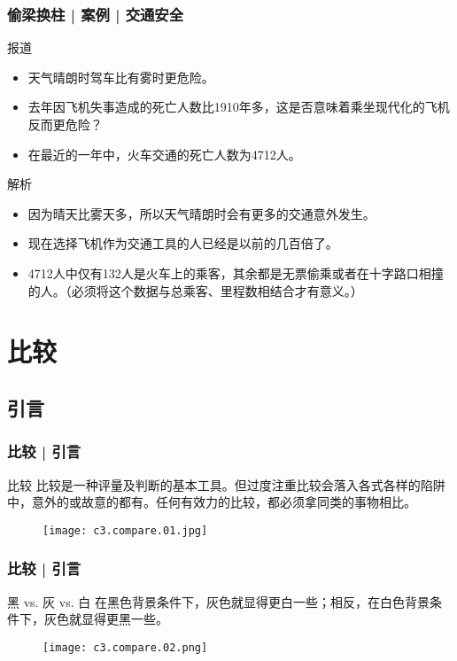 \begin{frame}
  \frametitle{偷梁换柱 | 案例 | 交通安全}
  \begin{block}{报道}
    \begin{itemize}
      \item 天气晴朗时驾车比有雾时更危险。
      \item 去年因飞机失事造成的死亡人数比1910年多，这是否意味着乘坐现代化的飞机反而更危险？
      \item 在最近的一年中，火车交通的死亡人数为4712人。
    \end{itemize}
  \end{block}
  \pause \pause \pause \pause
  \begin{block}{解析}
    \begin{itemize}
      \item 因为晴天比雾天多，所以天气晴朗时会有更多的交通意外发生。
      \item 现在选择飞机作为交通工具的人已经是以前的几百倍了。
      \item 4712人中仅有132人是火车上的乘客，其余都是无票偷乘或者在十字路口相撞的人。（必须将这个数据与总乘客、里程数相结合才有意义。）
    \end{itemize}
  \end{block}
\end{frame}

\section{比较}
\subsection{引言}
\begin{frame}
  \frametitle{比较 | 引言}
  \begin{block}{比较}
    比较是一种评量及判断的基本工具。但过度注重比较会落入各式各样的陷阱中，意外的或故意的都有。任何有效力的比较，都必须拿同类的事物相比。
    \vspace{-2em}
    \begin{figure}
      \centering
      \texttt{[image: c3.compare.01.jpg]}
    \end{figure}
  \end{block}
\end{frame}

\begin{frame}
  \frametitle{比较 | 引言}
  \begin{block}{黑 vs. 灰 vs. 白}
    在黑色背景条件下，灰色就显得更白一些；相反，在白色背景条件下，灰色就显得更黑一些。
  \begin{figure}
    \centering
    \texttt{[image: c3.compare.02.png]}
  \end{figure}
  \end{block}
\end{frame}

